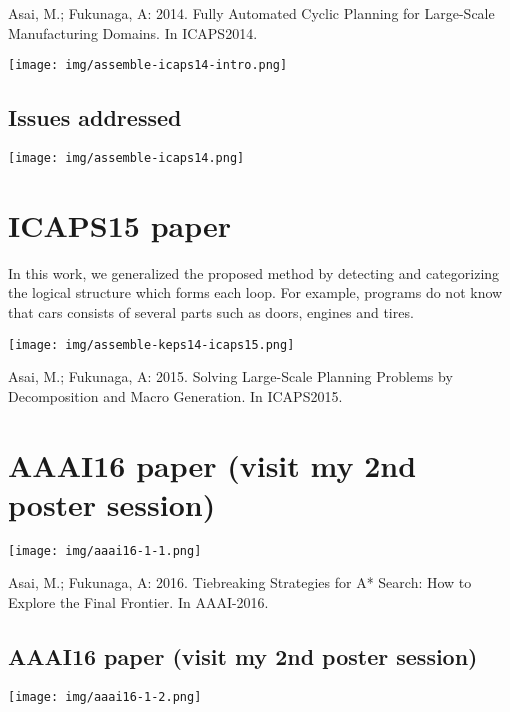 \begin{note}
Asai, M.; Fukunaga, A: 2014. Fully Automated Cyclic Planning for Large-Scale Manufacturing Domains. In ICAPS2014.
\end{note}

\texttt{[image: img/assemble-icaps14-intro.png]}

\subsection{Issues addressed}
\label{sec-3-1}

\texttt{[image: img/assemble-icaps14.png]}

\section{ICAPS15 paper}
\label{sec-4}

\begin{resume}
In this work, we generalized the proposed method by detecting and
categorizing the logical structure which forms each loop.
For example, programs do not know that cars consists of several parts such as doors, engines and tires.
\end{resume}

\texttt{[image: img/assemble-keps14-icaps15.png]}

\begin{note}
Asai, M.; Fukunaga, A: 2015. Solving Large-Scale Planning Problems by Decomposition and Macro Generation. In ICAPS2015.
\end{note}

\section{AAAI16 paper (visit my 2nd poster session)}
\label{sec-5}

\texttt{[image: img/aaai16-1-1.png]}

\begin{note}
Asai, M.; Fukunaga, A: 2016. Tiebreaking Strategies for A* Search: How to Explore the Final Frontier. In AAAI-2016.
\end{note}

\subsection{AAAI16 paper (visit my 2nd poster session)}
\label{sec-5-1}


\texttt{[image: img/aaai16-1-2.png]}

